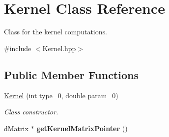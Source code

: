 \hypertarget{class_kernel}{}\section{Kernel Class Reference}
\label{class_kernel}


Class for the kernel computations.  




{\ttfamily \#include $<$Kernel.\+hpp$>$}

\subsection*{Public Member Functions}
\begin{DoxyCompactItemize}
\item 
\hyperlink{class_kernel_ae60e072c58cdc16842a239bdd0761590}{Kernel} (int type=0, double param=0)\hypertarget{class_kernel_ae60e072c58cdc16842a239bdd0761590}{}\label{class_kernel_ae60e072c58cdc16842a239bdd0761590}

\begin{DoxyCompactList}\small\item\em Class constructor. \end{DoxyCompactList}\item 
d\+Matrix $\ast$ {\bfseries get\+Kernel\+Matrix\+Pointer} ()\hypertarget{class_kernel_a4dc45b11849fada00d52060cee27730b}{}\label{class_kernel_a4dc45b11849fada00d52060cee27730b}


\end{DoxyCompactItemize}

